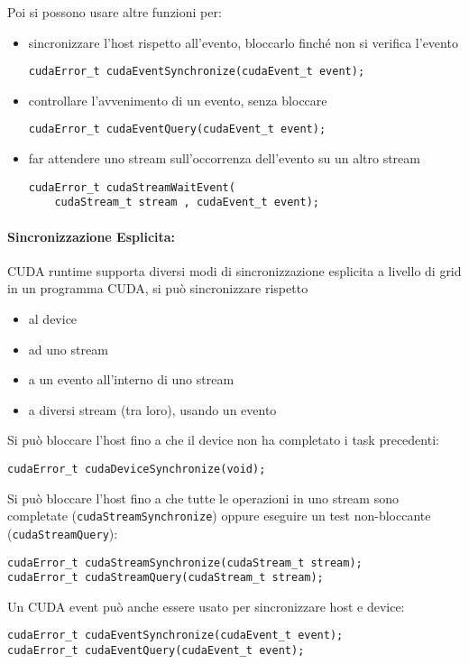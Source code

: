 Poi si possono usare altre funzioni per:
\begin{itemize}
	\item sincronizzare l'host rispetto all'evento, bloccarlo finché non si verifica l'evento
	\begin{verbatim}
cudaError_t cudaEventSynchronize(cudaEvent_t event);
	\end{verbatim}
	
	\item controllare l'avvenimento di un evento, senza bloccare
	\begin{verbatim}
cudaError_t cudaEventQuery(cudaEvent_t event);
	\end{verbatim}
	
	\item far attendere uno stream sull'occorrenza dell'evento su un altro stream
	\begin{verbatim}
cudaError_t cudaStreamWaitEvent(
    cudaStream_t stream , cudaEvent_t event);
	\end{verbatim}
\end{itemize}

\paragraph{Sincronizzazione Esplicita:} CUDA runtime supporta diversi modi di sincronizzazione esplicita a livello di grid in un programma CUDA, si può sincronizzare rispetto
\begin{itemize}
	\item al device
	
	\item ad uno stream
	
	\item a un evento all'interno di uno stream
	
	\item a diversi stream (tra loro), usando un evento
\end{itemize}

Si può bloccare l'host fino a che il device non ha completato i task precedenti:
\begin{verbatim}
cudaError_t cudaDeviceSynchronize(void);
\end{verbatim}

Si può bloccare l'host fino a che tutte le operazioni in uno stream sono completate (\texttt{cudaStreamSynchronize}) oppure eseguire un test non-bloccante (\texttt{cudaStreamQuery}):
\begin{verbatim}
cudaError_t cudaStreamSynchronize(cudaStream_t stream);
cudaError_t cudaStreamQuery(cudaStream_t stream);
\end{verbatim}

Un CUDA event può anche essere usato per sincronizzare host e device:
\begin{verbatim}
cudaError_t cudaEventSynchronize(cudaEvent_t event);
cudaError_t cudaEventQuery(cudaEvent_t event);
\end{verbatim}

